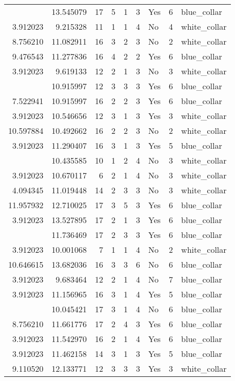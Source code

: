 \documentclass[
]{article}
\begin{document}
\begin{longtable}[t]{rrrrrllrl}
\addlinespace
3.912023 & 13.545079 & 17 & 5 & 1 & 3 & Yes & 6 & blue\_collar\\
3.912023 & 9.215328 & 11 & 1 & 1 & 4 & No & 4 & white\_collar\\
8.756210 & 11.082911 & 16 & 3 & 2 & 3 & No & 2 & white\_collar\\
9.476543 & 11.277836 & 16 & 4 & 2 & 2 & Yes & 6 & blue\_collar\\
3.912023 & 9.619133 & 12 & 2 & 1 & 3 & No & 3 & white\_collar\\
\addlinespace
4.248495 & 10.915997 & 12 & 3 & 3 & 3 & Yes & 6 & blue\_collar\\
7.522941 & 10.915997 & 16 & 2 & 2 & 3 & Yes & 6 & blue\_collar\\
3.912023 & 10.546656 & 12 & 3 & 1 & 3 & Yes & 3 & white\_collar\\
10.597884 & 10.492662 & 16 & 2 & 2 & 3 & No & 2 & white\_collar\\
3.912023 & 11.290407 & 16 & 3 & 1 & 3 & Yes & 5 & blue\_collar\\
\addlinespace
4.382027 & 10.435585 & 10 & 1 & 2 & 4 & No & 3 & white\_collar\\
3.912023 & 10.670117 & 6 & 2 & 1 & 4 & No & 3 & white\_collar\\
4.094345 & 11.019448 & 14 & 2 & 3 & 3 & No & 3 & white\_collar\\
11.957932 & 12.710025 & 17 & 3 & 5 & 3 & Yes & 6 & blue\_collar\\
3.912023 & 13.527895 & 17 & 2 & 1 & 3 & Yes & 6 & blue\_collar\\
\addlinespace
10.933999 & 11.736469 & 17 & 2 & 3 & 3 & Yes & 6 & blue\_collar\\
3.912023 & 10.001068 & 7 & 1 & 1 & 4 & No & 2 & white\_collar\\
10.646615 & 13.682036 & 16 & 3 & 3 & 6 & No & 6 & blue\_collar\\
3.912023 & 9.683464 & 12 & 2 & 1 & 4 & No & 7 & blue\_collar\\
3.912023 & 11.156965 & 16 & 3 & 1 & 4 & Yes & 5 & blue\_collar\\
\addlinespace
3.912023 & 10.045421 & 17 & 3 & 1 & 4 & No & 6 & blue\_collar\\
8.756210 & 11.661776 & 17 & 2 & 4 & 3 & Yes & 6 & blue\_collar\\
3.912023 & 11.542970 & 16 & 2 & 1 & 4 & Yes & 6 & blue\_collar\\
3.912023 & 11.462158 & 14 & 3 & 1 & 3 & Yes & 5 & blue\_collar\\
9.110520 & 12.133771 & 12 & 3 & 3 & 3 & Yes & 3 & white\_collar\\

\end{longtable}
\end{document}
